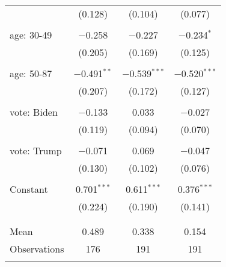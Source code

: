 \begin{tabular}{@{\extracolsep{5pt}}lccc}
  & (0.128) & (0.104) & (0.077) \\ 
  & & & \\ 
 age: 30-49 & $-$0.258 & $-$0.227 & $-$0.234$^{*}$ \\ 
  & (0.205) & (0.169) & (0.125) \\ 
  & & & \\ 
 age: 50-87 & $-$0.491$^{**}$ & $-$0.539$^{***}$ & $-$0.520$^{***}$ \\ 
  & (0.207) & (0.172) & (0.127) \\ 
  & & & \\ 
 vote: Biden & $-$0.133 & 0.033 & $-$0.027 \\ 
  & (0.119) & (0.094) & (0.070) \\ 
  & & & \\ 
 vote: Trump & $-$0.071 & 0.069 & $-$0.047 \\ 
  & (0.130) & (0.102) & (0.076) \\ 
  & & & \\ 
 Constant & 0.701$^{***}$ & 0.611$^{***}$ & 0.376$^{***}$ \\ 
  & (0.224) & (0.190) & (0.141) \\ 
  & & & \\ 
\hline \\[-1.8ex] 
Mean & 0.489 & 0.338 & 0.154 \\ 
Observations & 176 & 191 & 191 \\ 
\hline 
\hline \\[-1.8ex] 
\end{tabular} 
